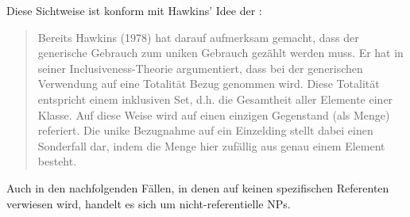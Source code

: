 Diese Sichtweise ist konform mit Hawkins' Idee der :  \blockcquote[43]{Studler2011}{Bereits Hawkins (1978) hat darauf aufmerksam gemacht, dass der generische  Gebrauch zum uniken Gebrauch gezählt werden muss. Er hat in seiner Inclusiveness-Theorie argumentiert, dass bei der generischen  Verwendung auf eine Totalität Bezug genommen wird. Diese Totalität entspricht einem inklusiven Set, d.h. die Gesamtheit
aller Elemente einer Klasse. Auf diese Weise wird auf einen einzigen Gegenstand (als
Menge) referiert. Die unike  Bezugnahme auf ein Einzelding stellt dabei einen Sonderfall
dar, indem die Menge hier zufällig aus genau einem Element besteht.} 



Auch in den nachfolgenden Fällen, in denen  auf keinen spezifischen Referenten  verwiesen wird, handelt es sich um nicht-referentielle NPs. 

